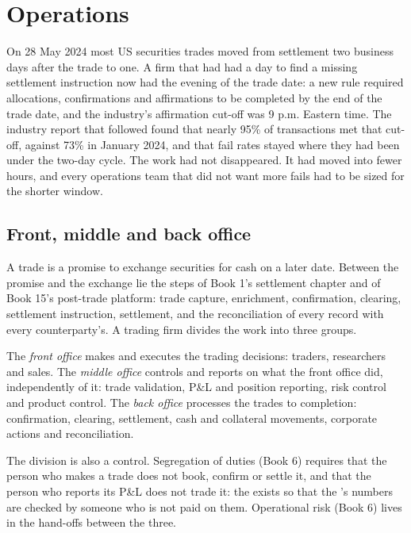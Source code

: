 \chapter{Operations}\label{ch:fm:operations}

On 28 May 2024 most US securities trades moved from settlement two business days after the trade to one. A firm that had had a day to find a
missing settlement instruction now had the evening of the trade date: a new rule required allocations, confirmations and affirmations to be
completed by the end of the trade date, and the industry's affirmation cut-off was 9 p.m. Eastern time. The industry report that followed found
that nearly 95\% of transactions met that cut-off, against 73\% in January 2024, and that fail rates stayed where they had been under the two-day
cycle. The work had not disappeared. It had moved into fewer hours, and every operations team that did not want more fails had to be sized for the
shorter window.

\section{Front, middle and back office}

A trade is a promise to exchange securities for cash on a later date. Between the promise and the exchange lie the steps of Book 1's settlement
chapter and of Book 15's post-trade platform: trade capture, enrichment, confirmation, clearing, settlement instruction, settlement, and the
reconciliation of every record with every counterparty's. A trading firm divides the work into three groups.

\begin{definition}\label{def:fm:operations:offices}
The \emph{front office} makes and executes the trading decisions: traders, researchers and sales. The \emph{middle
office} controls and reports on what the front office did, independently of it: trade validation, P\&L and position
reporting, risk control and product control. The \emph{back office} processes the trades to completion: confirmation,
clearing, settlement, cash and collateral movements, corporate actions and reconciliation.
\end{definition}

The division is also a control. Segregation of duties (Book 6) requires that the person who makes a trade does not book, confirm or settle it,
and that the person who reports its P\&L does not trade it: the  exists so that the 's numbers are checked by someone who
is not paid on them. Operational risk (Book 6) lives in the hand-offs between the three.


